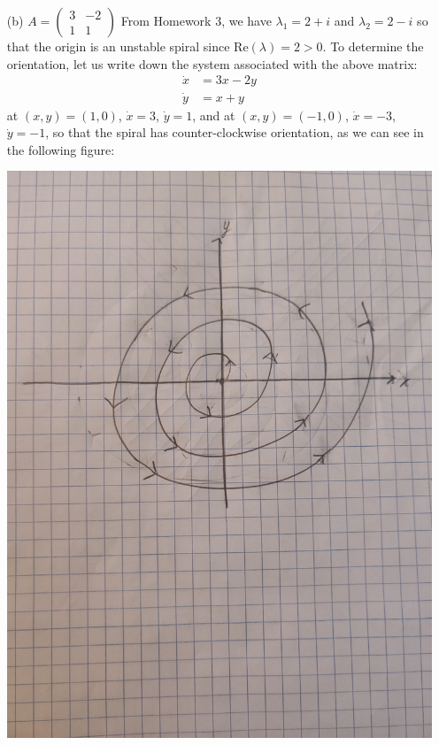 \documentclass{article}
\begin{document}
\begin{itemize}
\begin{itemize}
        \item[(b)] $A = \begin{pmatrix}
            3 & -2\\
            1 & 1
        \end{pmatrix}$
        \newline\newline
        From Homework 3, we have $\lambda_1 = 2 + i$ and $\lambda_2 = 2 - i$ so that the origin is an unstable spiral since $\text{Re}(\lambda) = 2 > 0$. To determine the orientation, let us write down the system associated with the above matrix:
        \begin{align*}
            \dot{x} &= 3x - 2y\\
            \dot{y} &= x + y
        \end{align*}
        at $(x,y) = (1,0)$, $\dot{x} = 3$, $\dot{y} = 1$, and at $(x,y) = (-1,0)$, $\dot{x} = -3$, $\dot{y} = -1$, so that the spiral has counter-clockwise orientation, as we can see in the following figure:
        \begin{center}
            \includegraphics[scale = 0.05]{prob1b_sketch.jpg}

\end{center}
\end{itemize}
\end{itemize}
\end{document}
